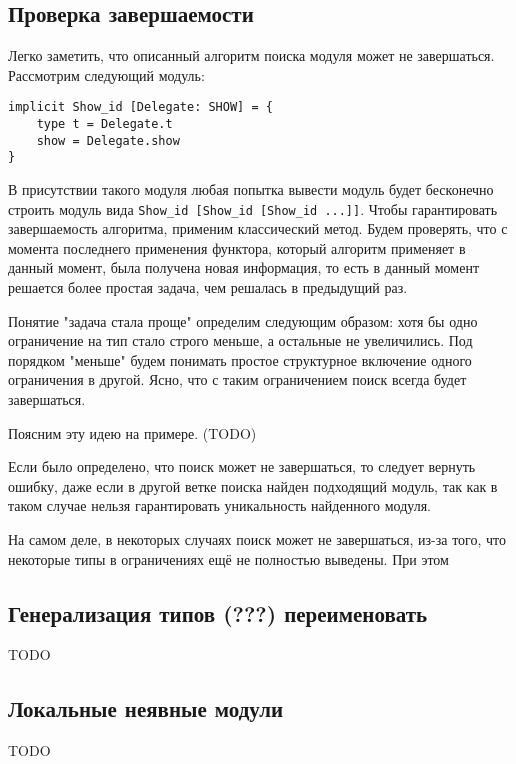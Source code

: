 \documentclass[../diploma.tex]{subfiles}
\begin{document}
\label{sec:2}

\subsection{Проверка завершаемости}

Легко заметить, что описанный алгоритм поиска модуля может не завершаться. Рассмотрим следующий модуль:

\begin{verbatim}
implicit Show_id [Delegate: SHOW] = {
    type t = Delegate.t
    show = Delegate.show
}
\end{verbatim}

В присутствии такого модуля любая попытка вывести модуль будет бесконечно строить модуль вида \texttt{Show_id [Show_id [Show_id ...]]}. Чтобы гарантировать завершаемость алгоритма, применим классический метод. Будем проверять, что с момента последнего применения функтора, который алгоритм применяет в данный момент, была получена новая информация, то есть в данный момент решается более простая задача, чем решалась в предыдущий раз.

Понятие "задача стала проще" определим следующим образом: хотя бы одно ограничение на тип стало строго меньше, а остальные не увеличились. Под порядком "меньше" будем понимать простое структурное включение одного ограничения в другой. Ясно, что с таким ограничением поиск всегда будет завершаться.

Поясним эту идею на примере. (TODO)

Если было определено, что поиск может не завершаться, то следует вернуть ошибку, даже если в другой ветке поиска найден подходящий модуль, так как в таком случае нельзя гарантировать уникальность найденного модуля.

На самом деле, в некоторых случаях поиск может не завершаться, из-за того, что некоторые типы в ограничениях ещё не полностью выведены. При этом 

\subsection{Генерализация типов (???) переименовать}

TODO

\subsection{Локальные неявные модули}

TODO
\end{document}
